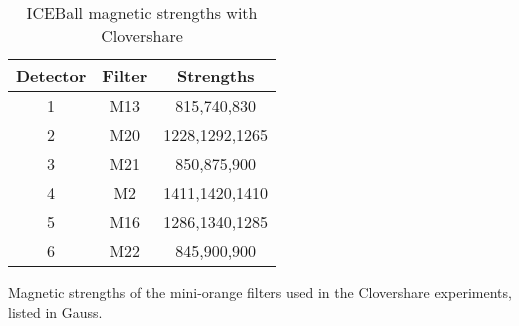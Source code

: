\begin{table}[]
    \centering
    \caption{ICEBall magnetic strengths with Clovershare}
    \begin{tabular}{c|c|c} \toprule
         Detector & Filter & Strengths \\
         \hline
         1 & M13 & 815,740,830 \\ 
         2 & M20 & 1228,1292,1265\\
         3 & M21 & 850,875,900 \\
         4 & M2 & 1411,1420,1410\\
         5 & M16 & 1286,1340,1285\\
         6 & M22 & 845,900,900\\ \bottomrule
    \end{tabular}
    \footnotesize
    \item{Magnetic strengths of the mini-orange filters used in the Clovershare experiments, listed in Gauss. }
    \label{tab:ICE_Magnet_C}
\end{table}